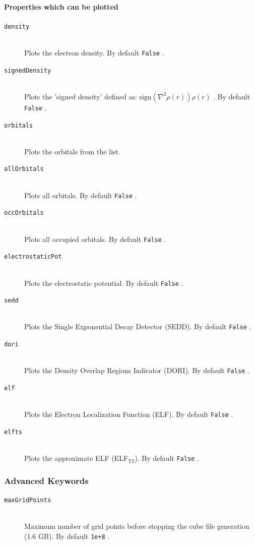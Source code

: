 \documentclass[bibliography=totocnumbered,a4paper,10pt,oneside]{scrbook}
\newcommand{\ttt}[1]{%
  \begingroup\setlength{\fboxsep}{1pt}%
  \colorbox{serenity-green!30}{\texttt{\hspace*{2pt}\vphantom{(g}#1\hspace*{2pt}}}%
  \endgroup
}
\begin{document}
\paragraph{Properties which can be plotted}
\begin{description}
    \item [\texttt{density}]\hfill \\
    Plots the electron density. By default \ttt{False}.
    \item [\texttt{signedDensity}]\hfill \\
    Plots the 'signed density' defined as: $\mathrm{sign}(\nabla^2\rho(r))\rho(r)$ . By default \ttt{False}.
    \item [\texttt{orbitals}]\hfill \\
    Plots the orbitals from the list.
    \item [\texttt{allOrbitals}]\hfill \\
    Plots all orbitals. By default \ttt{False}.
    \item [\texttt{occOrbitals}]\hfill \\
    Plots all occupied orbitals. By default \ttt{False}.
    \item [\texttt{electrostaticPot}]\hfill \\
    Plots the electrostatic potential. By default \ttt{False}.
    \item [\texttt{sedd}]\hfill \\
    Plots the Single Exponential Decay Detector (SEDD). By default \ttt{False}.
    \item [\texttt{dori}]\hfill \\
    Plots the Density Overlap Regions Indicator (DORI). By default \ttt{False}.
    \item [\texttt{elf}]\hfill \\
    Plots the Electron Localization Function (ELF). By default \ttt{False}.
    \item [\texttt{elfts}]\hfill \\
    Plots the approximate ELF (ELF$_\text{TS}$). By default \ttt{False}.
\end{description}

\subsubsection{Advanced Keywords}
\begin{description}
    \item [\texttt{maxGridPoints}]\hfill \\
Maximum number of grid points before stopping the cube file generation (1.6 GB). By default \ttt{1e+8}.
\end{description}
\end{document}
